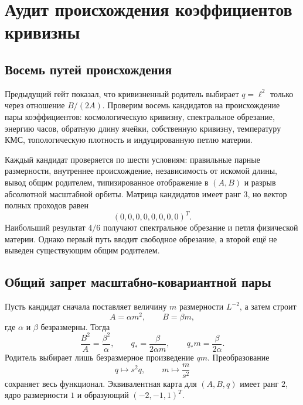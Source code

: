 \chapter{Аудит происхождения коэффициентов кривизны}
\label{ch:v10-cell-birth-curvature-coefficient-origin-audit}

\section{Восемь путей происхождения}

Предыдущий гейт показал, что кривизненный родитель выбирает
$q=\ell^2$ только через отношение $B/(2A)$. Проверим восемь кандидатов на
происхождение пары коэффициентов: космологическую кривизну, спектральное
обрезание, энергию часов, обратную длину ячейки, собственную кривизну,
температуру КМС, топологическую плотность и индуцированную петлю материи.

Каждый кандидат проверяется по шести условиям: правильные парные
размерности, внутреннее происхождение, независимость от искомой длины,
вывод общим родителем, типизированное отображение в $(A,B)$ и разрыв
абсолютной масштабной орбиты. Матрица кандидатов имеет ранг $3$, но вектор
полных проходов равен
\begin{equation}
 (0,0,0,0,0,0,0,0)^T.
 \label{eq:v10-curvature-coefficient-pass-vector}
\end{equation}
Наибольший результат $4/6$ получают спектральное обрезание и петля
физической материи. Однако первый путь вводит свободное обрезание, а второй
ещё не выведен существующим общим родителем.

\section{Общий запрет масштабно-ковариантной пары}

Пусть кандидат сначала поставляет величину $m$ размерности $L^{-2}$, а
затем строит
\begin{equation}
 A=\alpha m^2,
 \qquad B=\beta m,
 \label{eq:v10-curvature-coefficient-seed}
\end{equation}
где $\alpha$ и $\beta$ безразмерны. Тогда
\begin{equation}
 \frac{B^2}{A}=\frac{\beta^2}{\alpha},
 \qquad
 q_*=\frac{\beta}{2\alpha m},
 \qquad
 q_*m=\frac{\beta}{2\alpha}.
 \label{eq:v10-curvature-coefficient-invariant}
\end{equation}
Родитель выбирает лишь безразмерное произведение $qm$. Преобразование
\begin{equation}
 q\mapsto s^2q,
 \qquad m\mapsto\frac{m}{s^2}
 \label{eq:v10-curvature-seed-orbit}
\end{equation}
сохраняет весь функционал. Эквивалентная карта для $(A,B,q)$ имеет
ранг $2$, ядро размерности $1$ и образующий $(-2,-1,1)^T$.

